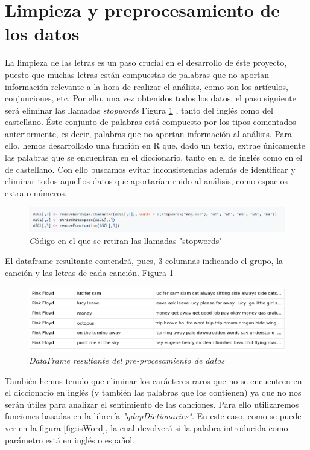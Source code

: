 \section{Limpieza y preprocesamiento de los datos}
La limpieza de las letras es un paso crucial en el desarrollo de éste proyecto, puesto que muchas letras están compuestas de palabras que no aportan información relevante a la hora de realizar el análisis, como son los artículos, conjunciones, etc. Por ello, una vez obtenidos todos los datos, el paso siguiente será eliminar las llamadas \textit{stopwords} Figura \ref{fig:removeStopWords} , tanto del inglés como del castellano. Éste conjunto de palabras está compuesto por los tipos comentados anteriormente, es decir, palabras que no aportan información al análisis. Para ello, hemos desarrollado una función en R que, dado un texto, extrae únicamente las palabras que se encuentran en el diccionario, tanto en el de inglés como en el de castellano. Con ello buscamos evitar inconsistencias además de identificar y eliminar todos aquellos datos que aportarían ruido al análisis, como espacios extra o números.

\begin{figure}[h]
	\centering
	\includegraphics[width=1\linewidth]{Imagenes/removeStopWords}
	\caption{\textit Código en el que se retiran las llamadas "stopwords"}
	\label{fig:removeStopWords}
\end{figure}

El dataframe resultante contendrá, pues, 3 columnas indicando el grupo, la canción y las letras de cada canción. Figura \ref{fig:removeStopWords}

\begin{figure}[h]
	\centering
	\includegraphics[width=1\linewidth]{Imagenes/datasetDataCleaning}
	\caption{\textit{DataFrame resultante del pre-procesamiento de datos}}
	\label{fig:datasetDataCleaning}
\end{figure}

También hemos tenido que eliminar los carácteres raros que no se encuentren en el diccionario en inglés (y también las palabras que los contienen) ya que no nos serán útiles para analizar el sentimiento de las canciones. Para ello utilizaremos funciones basadas en la librería  \textit{"qdapDictionaries"}. En este caso, como se puede ver en la figura \ref{fig:isWord}, la cual devolverá si la palabra introducida como parámetro está en inglés o español.

